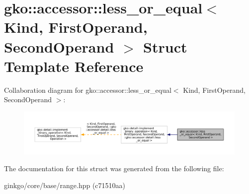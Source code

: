 \hypertarget{structgko_1_1accessor_1_1less__or__equal}{}\section{gko\+:\+:accessor\+:\+:less\+\_\+or\+\_\+equal$<$ Kind, First\+Operand, Second\+Operand $>$ Struct Template Reference}
\label{structgko_1_1accessor_1_1less__or__equal}


Collaboration diagram for gko\+:\+:accessor\+:\+:less\+\_\+or\+\_\+equal$<$ Kind, First\+Operand, Second\+Operand $>$\+:
\nopagebreak
\begin{figure}[H]
\begin{center}
\leavevmode
\includegraphics[width=350pt]{structgko_1_1accessor_1_1less__or__equal__coll__graph}
\end{center}
\end{figure}


The documentation for this struct was generated from the following file\+:\begin{DoxyCompactItemize}
\item 
ginkgo/core/base/range.\+hpp (c71510aa)\end{DoxyCompactItemize}

